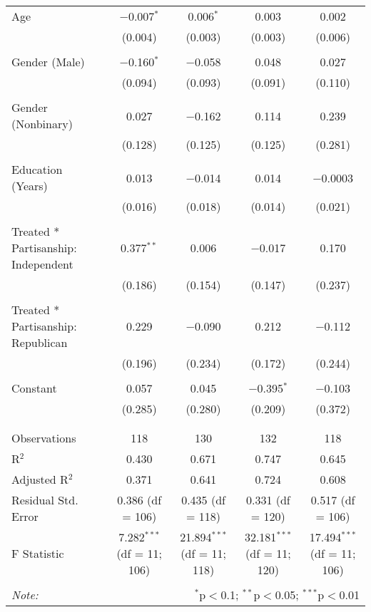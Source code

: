 \begin{table}[!htbp]
\begin{tabular}{@{\extracolsep{5pt}}lcccc}
 Age & $-$0.007$^{*}$ & 0.006$^{*}$ & 0.003 & 0.002 \\ 
  & (0.004) & (0.003) & (0.003) & (0.006) \\ 
  & & & & \\ 
 Gender (Male) & $-$0.160$^{*}$ & $-$0.058 & 0.048 & 0.027 \\ 
  & (0.094) & (0.093) & (0.091) & (0.110) \\ 
  & & & & \\ 
 Gender (Nonbinary) & 0.027 & $-$0.162 & 0.114 & 0.239 \\ 
  & (0.128) & (0.125) & (0.125) & (0.281) \\ 
  & & & & \\ 
 Education (Years) & 0.013 & $-$0.014 & 0.014 & $-$0.0003 \\ 
  & (0.016) & (0.018) & (0.014) & (0.021) \\ 
  & & & & \\ 
 Treated * Partisanship: Independent & 0.377$^{**}$ & 0.006 & $-$0.017 & 0.170 \\ 
  & (0.186) & (0.154) & (0.147) & (0.237) \\ 
  & & & & \\ 
 Treated * Partisanship: Republican & 0.229 & $-$0.090 & 0.212 & $-$0.112 \\ 
  & (0.196) & (0.234) & (0.172) & (0.244) \\ 
  & & & & \\ 
 Constant & 0.057 & 0.045 & $-$0.395$^{*}$ & $-$0.103 \\ 
  & (0.285) & (0.280) & (0.209) & (0.372) \\ 
  & & & & \\ 
\hline \\[-1.8ex] 
Observations & 118 & 130 & 132 & 118 \\ 
R$^{2}$ & 0.430 & 0.671 & 0.747 & 0.645 \\ 
Adjusted R$^{2}$ & 0.371 & 0.641 & 0.724 & 0.608 \\ 
Residual Std. Error & 0.386 (df = 106) & 0.435 (df = 118) & 0.331 (df = 120) & 0.517 (df = 106) \\ 
F Statistic & 7.282$^{***}$ (df = 11; 106) & 21.894$^{***}$ (df = 11; 118) & 32.181$^{***}$ (df = 11; 120) & 17.494$^{***}$ (df = 11; 106) \\ 
\hline 
\hline \\[-1.8ex] 
\textit{Note:}  & \multicolumn{4}{r}{$^{*}$p$<$0.1; $^{**}$p$<$0.05; $^{***}$p$<$0.01} \\ 
\end{tabular} 
\end{table} 
